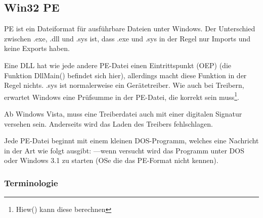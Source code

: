 \subsection{Win32 PE}
\label{win32_pe}

\acs{PE} ist ein Dateiformat für ausführbare Dateien unter Windows.
Der Unterschied zwischen .exe, .dll und .sys ist, dass .exe und .sys in der Regel
nur Imports und keine Exports haben.


Eine \ac{DLL} hat wie jede andere PE-Datei einen Eintrittspunkt (\ac{OEP}) (die
Funktion DllMain() befindet sich hier), allerdings macht diese Funktion in der
Regel nichts.
.sys ist normalerweise ein Gerätetreiber.
Wie auch bei Treibern, erwartet Windows eine Prüfsumme in der PE-Datei, die korrekt
sein muss\footnote{Hiew() kann diese berechnen}.

Ab Windows Vista, muss eine Treiberdatei auch mit einer digitalen Signatur versehen
sein. Anderseits wird das Laden des Treibers fehlschlagen.

Jede PE-Datei beginnt mit einem kleinen DOS-Programm, welches eine Nachricht in der
Art wie folgt ausgibt:
---wenn versucht wird
das Programm unter DOS oder Windows 3.1 zu starten (\ac{OS}e die das PE-Format
nicht kennen).

\subsubsection{Terminologie}


